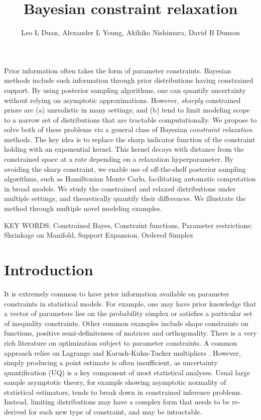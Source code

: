 \documentclass[10pt,fleqn]{article}
\title{\textbf{Bayesian constraint relaxation}}
\author{Leo L Duan, Alexander L Young, Akihiko Nishimura, David B Dunson}
\date{}
\DeclareMathOperator{\1}{\mathbbm{1}} \DeclareMathOperator{\bigO}{\mc O}
\begin{document}
\maketitle %

Prior information often takes  the form of parameter constraints. Bayesian
methods include such information through prior distributions having constrained
support. By using posterior sampling algorithms, one can quantify uncertainty
without relying on asymptotic approximations. However, {\em sharply}
constrained priors are (a) unrealistic in many settings; and (b) tend to limit
modeling scope to a narrow set of distributions that are tractable computationally.
We propose to solve both of these problems via a general class of Bayesian 
{\em constraint relaxation} methods.  The key idea is to replace the sharp
indicator function of the constraint holding with an exponential kernel.  This
kernel decays with distance from the constrained space at a rate depending on 
a relaxation hyperparameter.  By avoiding the sharp constraint, we enable use of
off-the-shelf posterior sampling algorithms, such as Hamiltonian Monte Carlo, 
facilitating automatic computation in broad models. We study the constrained and 
relaxed distributions under multiple settings, and theoretically quantify their 
differences. We illustrate the method through multiple novel modeling examples.

\vskip 12pt
        {\noindent KEY WORDS: Constrained Bayes, Constraint
        functions, Parameter restrictions; Shrinkage on Manifold, Support Expansion, Ordered Simplex}
{}

\newpage

\section{Introduction}

It is extremely common to have prior information available on parameter
constraints in statistical models. For example, one may have prior
knowledge that a vector of parameters lies on the probability simplex or
satisfies a particular set of inequality constraints. Other common examples
include shape constraints on functions, positive semi-definiteness of
matrices and orthogonality. There is a very rich literature on optimization
subject to parameter constraints. A common approach relies on Lagrange
and Karush-Kuhn-Tucker multipliers \citep{boyd2004convex}. However, simply
producing a point estimate is often insufficient, as uncertainty
quantification (UQ) is a key component of most statistical analyses. Usual
large sample asymptotic theory, for example showing asymptotic normality of
statistical estimators, tends to break down in constrained inference
problems. Instead, limiting distributions may have a complex form that
needs to be re-derived for each new type of constraint, and may be
intractable.
\end{document}
